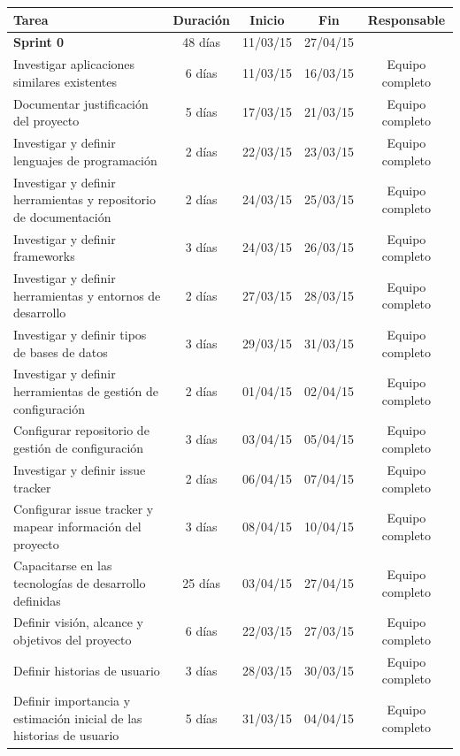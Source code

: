 {\scriptsize
\begin{center}
\begin{longtable}{|p{6cm}|c|c|c|c|}
    \hline
        \textbf{Tarea} &
        \textbf{Duración} &
        \textbf{Inicio} &
        \textbf{Fin} &
        \textbf{Responsable}\\
    \hline
        \textbf{Sprint 0} & 48 días & 11/03/15 & 27/04/15 &\\
    \hline
          Investigar aplicaciones similares existentes & 6 días & 11/03/15 & 16/03/15 & Equipo completo\\ \hline
  Documentar justificación del proyecto & 5 días & 17/03/15 & 21/03/15 & Equipo completo \\ \hline
  Investigar y definir lenguajes de programación & 2 días & 22/03/15 & 23/03/15 & Equipo completo \\ \hline
  Investigar y definir herramientas y repositorio de documentación & 2 días & 24/03/15 & 25/03/15 & Equipo completo\\ \hline
  Investigar y definir frameworks & 3 días & 24/03/15 & 26/03/15& Equipo completo \\ \hline
  Investigar y definir herramientas y entornos de desarrollo & 2 días & 27/03/15 & 28/03/15& Equipo completo \\ \hline
  Investigar y definir tipos de bases de datos & 3 días & 29/03/15 & 31/03/15 & Equipo completo\\ \hline
  Investigar y definir herramientas de gestión de configuración & 2 días & 01/04/15 & 02/04/15 & Equipo completo\\ \hline
  Configurar repositorio de gestión de configuración & 3 días & 03/04/15 & 05/04/15& Equipo completo \\ \hline
  Investigar y definir issue tracker & 2 días & 06/04/15 & 07/04/15& Equipo completo \\ \hline
  Configurar issue tracker y mapear información del proyecto & 3 días & 08/04/15 & 10/04/15& Equipo completo \\ \hline
  Capacitarse en las tecnologías de desarrollo definidas & 25 días & 03/04/15 & 27/04/15& Equipo completo \\ \hline
  Definir visión, alcance y objetivos del proyecto & 6 días & 22/03/15 & 27/03/15& Equipo completo \\ \hline
  Definir historias de usuario & 3 días & 28/03/15 & 30/03/15& Equipo completo \\ \hline
  Definir importancia y estimación inicial de las historias de usuario & 5 días & 31/03/15 & 04/04/15& Equipo completo \\ \hline

\end{longtable}
\end{center}}

